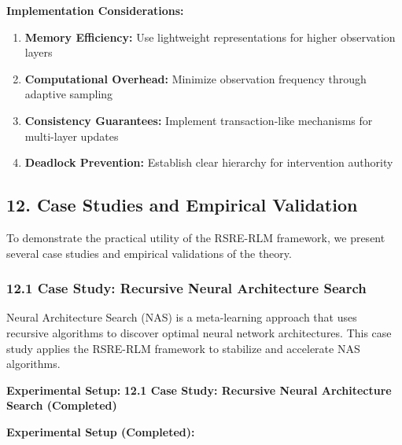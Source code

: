 \documentclass[
]{article}
\providecommand{\tightlist}{%
  \setlength{\itemsep}{0pt}\setlength{\parskip}{0pt}}
\begin{document}
\textbf{Implementation Considerations:}

\begin{enumerate}
\def\labelenumi{\arabic{enumi}.}
\tightlist
\item
  \textbf{Memory Efficiency:} Use lightweight representations for higher
  observation layers
\item
  \textbf{Computational Overhead:} Minimize observation frequency
  through adaptive sampling
\item
  \textbf{Consistency Guarantees:} Implement transaction-like mechanisms
  for multi-layer updates
\item
  \textbf{Deadlock Prevention:} Establish clear hierarchy for
  intervention authority
\end{enumerate}

\subsection{12. Case Studies and Empirical
Validation}\label{case-studies-and-empirical-validation}

To demonstrate the practical utility of the RSRE-RLM framework, we
present several case studies and empirical validations of the theory.

\subsubsection{12.1 Case Study: Recursive Neural Architecture
Search}\label{case-study-recursive-neural-architecture-search}

Neural Architecture Search (NAS) is a meta-learning approach that uses
recursive algorithms to discover optimal neural network architectures.
This case study applies the RSRE-RLM framework to stabilize and
accelerate NAS algorithms.

\textbf{Experimental Setup:} \textbf{12.1 Case Study: Recursive Neural
Architecture Search (Completed)}

\textbf{Experimental Setup (Completed):}
\end{document}
